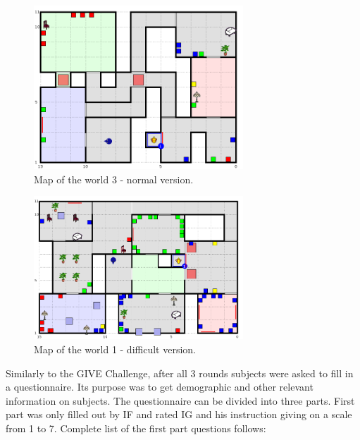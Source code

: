 \begin{figure}[!htbp]
  \centering
	\includegraphics[width=0.7\textwidth]{Images/dataset-world3}
	\caption{Map of the world 3 - normal version.}
	\label{fig:dataset-world3}
\end{figure}

\begin{figure}[!htbp]
  \centering
	\includegraphics[width=0.7\textwidth]{Images/dataset-world1d}
	\caption{Map of the world 1 - difficult version.}
	\label{fig:dataset-world1d}
\end{figure}

Similarly to the GIVE Challenge, after all 3 rounds subjects were asked to fill in a questionnaire. Its purpose was to get demographic and other relevant information on subjects. The questionnaire can be divided into three parts. First part was only filled out by IF and rated IG and his instruction giving on a scale from 1 to 7. Complete list of the first part questions follows: 

